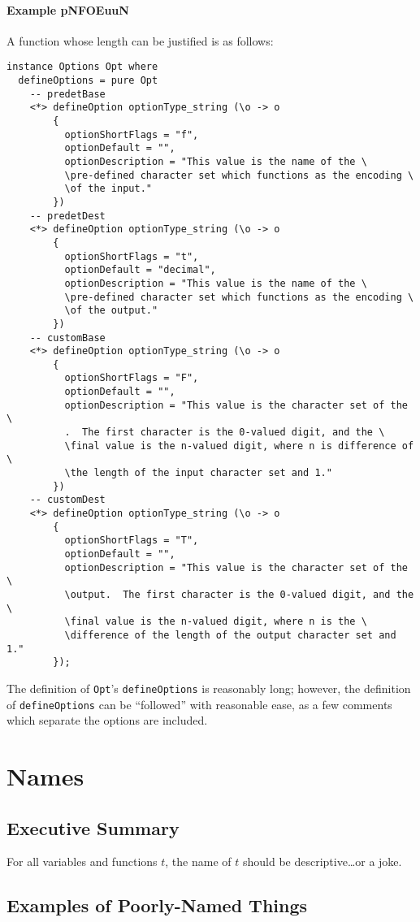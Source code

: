 \documentclass{report}
\begin{document}
\subsubsection{Example pNFOEuuN}
A function whose length can be justified is as follows:
\begin{lstlisting}
instance Options Opt where
  defineOptions = pure Opt
    -- predetBase
    <*> defineOption optionType_string (\o -> o
        {
          optionShortFlags = "f",
          optionDefault = "",
          optionDescription = "This value is the name of the \
          \pre-defined character set which functions as the encoding \
          \of the input."
        })
    -- predetDest
    <*> defineOption optionType_string (\o -> o
        {
          optionShortFlags = "t",
          optionDefault = "decimal",
          optionDescription = "This value is the name of the \
          \pre-defined character set which functions as the encoding \
          \of the output."
        })
    -- customBase
    <*> defineOption optionType_string (\o -> o
        {
          optionShortFlags = "F",
          optionDefault = "",
          optionDescription = "This value is the character set of the \
          .  The first character is the 0-valued digit, and the \
          \final value is the n-valued digit, where n is difference of \
          \the length of the input character set and 1."
        })
    -- customDest
    <*> defineOption optionType_string (\o -> o
        {
          optionShortFlags = "T",
          optionDefault = "",
          optionDescription = "This value is the character set of the \
          \output.  The first character is the 0-valued digit, and the \
          \final value is the n-valued digit, where n is the \
          \difference of the length of the output character set and 1."
        });
\end{lstlisting}
The definition of \texttt{Opt}'s \texttt{defineOptions} is reasonably long; however, the definition of \texttt{defineOptions} can be ``followed'' with reasonable ease, as a few comments which separate the options are included.
\chapter{Names}
\section{Executive Summary}
For all variables and functions $t$, the name of $t$ should be descriptive\ldots or a joke.
\section{Examples of Poorly-Named Things}
\end{document}
